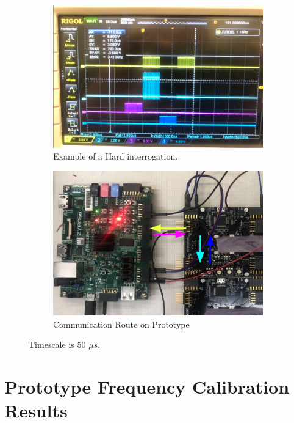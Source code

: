 \begin{figure}
\centering
\begin{subfigure}{0.475\textwidth}
  \centering
  \includegraphics[width=\textwidth]{images/qdb_example_packet_waveform.png}
  \caption{Example of a Hard interrogation.}
\end{subfigure}%
\begin{subfigure}{0.475\textwidth}
  \centering
  \includegraphics[width=\textwidth]{images/qdb_example_packet_waveform_diagram.png}
  \caption{Communication Route on Prototype}
\end{subfigure}
\caption{Timescale is 50 $\unit{\mu s}$.}
\label{fig:example_broadcast}
\end{figure}

\section{Prototype Frequency Calibration Results}~\label{sec:freq_calib_results}


